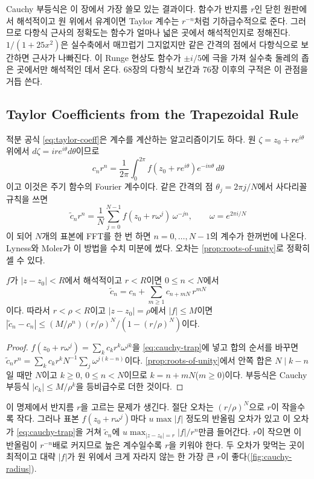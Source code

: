 Cauchy 부등식은 이 장에서 가장 쓸모 있는 결과이다. 함수가 반지름 $r$인 닫힌 원판에서 해석적이고 원 위에서 유계이면 Taylor 계수는 $r^{-n}$처럼 기하급수적으로 준다. 그러므로 다항식 근사의 정확도는 함수가 얼마나 넓은 곳에서 해석적인지로 정해진다. $1/(1+25x^2)$은 실수축에서 매끄럽기 그지없지만 같은 간격의 점에서 다항식으로 보간하면 근사가 나빠진다. 이 Runge 현상도 함수가 $\pm i/5$에 극을 가져 실수축 둘레의 좁은 곳에서만 해석적인 데서 온다. 68장의 다항식 보간과 76장 이후의 구적은 이 관점을 거듭 쓴다.

\subsection{Taylor Coefficients from the Trapezoidal Rule}
\label{sec:cauchy-fft}

적분 공식 \cref{eq:taylor-coeff}은 계수를 계산하는 알고리즘이기도 하다. 원 $\zeta=z_0+re^{i\theta}$ 위에서 $d\zeta=ire^{i\theta}d\theta$이므로
\[
c_nr^n=\frac{1}{2\pi}\int_0^{2\pi}f(z_0+re^{i\theta})e^{-in\theta}\,d\theta
\]
이고 이것은 주기 함수의 Fourier 계수이다. 같은 간격의 점 $\theta_j=2\pi j/N$에서 사다리꼴 규칙을 쓰면
\begin{equation}
\label{eq:cauchy-trap}
\tilde c_nr^n=\frac1N\sum_{j=0}^{N-1}f(z_0+r\omega^j)\,\omega^{-jn},\qquad\omega=e^{2\pi i/N}
\end{equation}
이 되어 $N$개의 표본에 FFT를 한 번 하면 $n=0,\dots,N-1$의 계수가 한꺼번에 나온다. Lyness와 Moler\cite{lyness1967}가 이 방법을 수치 미분에 썼다. 오차는 \cref{prop:roots-of-unity}로 정확히 셀 수 있다.

\begin{proposition}
\label{prop:cauchy-alias}
$f$가 $|z-z_0|<R$에서 해석적이고 $r<R$이면 $0\le n<N$에서
\[
\tilde c_n=c_n+\sum_{m\ge1}c_{n+mN}\,r^{mN}
\]
이다. 따라서 $r<\rho<R$이고 $|z-z_0|=\rho$에서 $|f|\le M$이면 $|\tilde c_n-c_n|\le(M/\rho^n)(r/\rho)^N/(1-(r/\rho)^N)$이다.
\end{proposition}

\begin{proof}
$f(z_0+r\omega^j)=\sum_kc_kr^k\omega^{jk}$을 \cref{eq:cauchy-trap}에 넣고 합의 순서를 바꾸면 $\tilde c_nr^n=\sum_kc_kr^kN^{-1}\sum_j\omega^{j(k-n)}$이다. \cref{prop:roots-of-unity}에서 안쪽 합은 $N\mid k-n$일 때만 $N$이고 $k\ge0$, $0\le n<N$이므로 $k=n+mN$($m\ge0$)이다. 부등식은 Cauchy 부등식 $|c_k|\le M/\rho^k$을 등비급수로 더한 것이다.
\end{proof}

이 명제에서 반지름 $r$을 고르는 문제가 생긴다. 절단 오차는 $(r/\rho)^N$으로 $r$이 작을수록 작다. 그러나 표본 $f(z_0+r\omega^j)$마다 $u\max|f|$ 정도의 반올림 오차가 있고 이 오차가 \cref{eq:cauchy-trap}을 거쳐 $\tilde c_n$에 $u\max_{|z-z_0|=r}|f|/r^n$만큼 들어간다. $r$이 작으면 이 반올림이 $r^{-n}$배로 커지므로 높은 계수일수록 $r$을 키워야 한다. 두 오차가 맞먹는 곳이 최적이고 대략 $|f|$가 원 위에서 크게 자라지 않는 한 가장 큰 $r$이 좋다(\cref{fig:cauchy-radius}).

